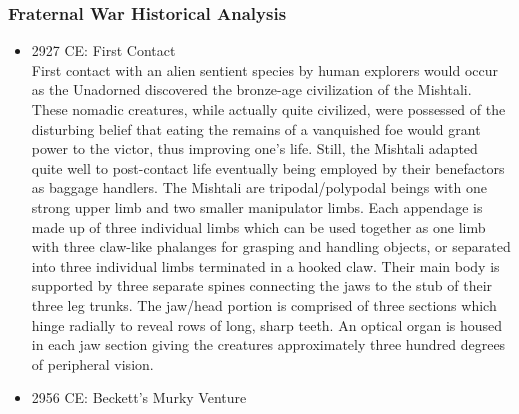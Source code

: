 \subsubsection{Fraternal War Historical Analysis}

\begin{itemize}
\item 2927 CE: First Contact \\ 

First contact with an alien sentient species by human explorers would
occur as the Unadorned discovered the bronze-age civilization of the
Mishtali.  These nomadic creatures, while actually quite civilized,
were possessed of the disturbing belief that eating the remains of a
vanquished foe would grant power to the victor, thus improving one's
life.  Still, the Mishtali adapted quite well to post-contact life
eventually being employed by their benefactors as baggage handlers.
The Mishtali are tripodal/polypodal beings with one strong upper limb
and two smaller manipulator limbs.  Each appendage is made up of three
individual limbs which can be used together as one limb with three
claw-like phalanges for grasping and handling objects, or separated
into three individual limbs terminated in a hooked claw.  Their main
body is supported by three separate spines connecting the jaws to the
stub of their three leg trunks.  The jaw/head portion is comprised of
three sections which hinge radially to reveal rows of long, sharp
teeth.  An optical organ is housed in each jaw section giving the
creatures approximately three hundred degrees of peripheral vision.

\item 2956 CE: Beckett's Murky Venture \\


\end{itemize}
